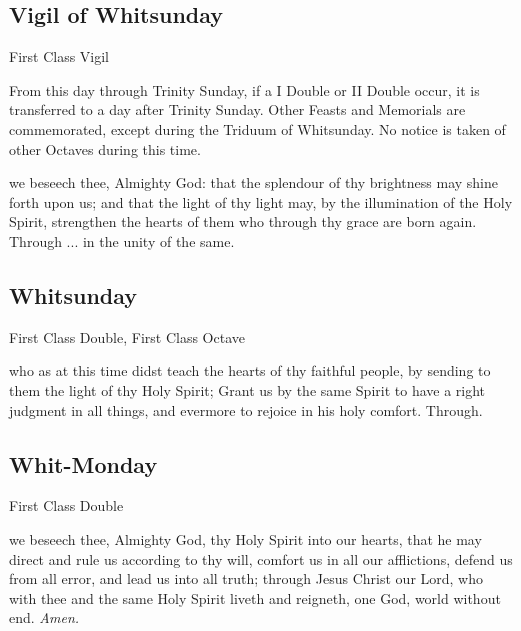 \subsection{Vigil of Whitsunday}
\begin{inhead}
    {First Class Vigil}
\end{inhead}

\begin{rubric}
	From this day through Trinity Sunday, if a I Double or II Double occur, it is transferred to a day after Trinity Sunday. Other Feasts and Memorials are commemorated, except during the Triduum of Whitsunday. No notice is taken of other Octaves during this time.
\end{rubric}

\collect
{} we beseech thee, Almighty God: that the splendour of thy brightness may shine forth upon us; and that the light of thy light may, by the illumination of the Holy Spirit, strengthen the hearts of them who through thy grace are born again. Through ... in the unity of the same.


\subsection{Whitsunday}
\begin{inhead}
    {First Class Double, First Class Octave}
\end{inhead}

\collect
{} who as at this time didst teach the hearts of thy faithful people, by sending to them the light of thy Holy Spirit; Grant us by the same Spirit to have a right judgment in all things, and evermore to rejoice in his holy comfort. Through.


\subsection{Whit-Monday}
\begin{inhead}
    {First Class Double}
\end{inhead}

\collect
{} we beseech thee, Almighty God, thy Holy Spirit into our hearts, that he may direct and rule us according to thy will, comfort us in all our afflictions, defend us from all error, and lead us into all truth; through Jesus Christ our Lord, who with thee and the same Holy Spirit liveth and reigneth, one God, world without end. \textit{Amen.}


